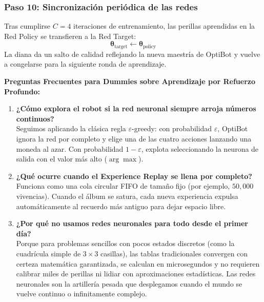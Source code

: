 \begin{calculomanual}
\subsubsection*{Paso 10: Sincronización periódica de las redes}
Tras cumplirse $C = 4$ iteraciones de entrenamiento, las perillas aprendidas en la Red Policy se transfieren a la Red Target:
\[
  \boldsymbol{\theta}_{\text{target}} \leftarrow \boldsymbol{\theta}_{\text{policy}}
\]
La diana da un salto de calidad reflejando la nueva maestría de OptiBot y vuelve a congelarse para la siguiente ronda de aprendizaje.
\end{calculomanual}

\begin{ideaclave}
\textbf{Preguntas Frecuentes para Dummies sobre Aprendizaje por Refuerzo Profundo:}
\begin{enumerate}
  \item \textbf{¿Cómo explora el robot si la red neuronal siempre arroja números continuos?} \\
  Seguimos aplicando la clásica regla $\varepsilon$-greedy: con probabilidad $\varepsilon$, OptiBot ignora la red por completo y elige una de las cuatro acciones lanzando una moneda al azar. Con probabilidad $1-\varepsilon$, explota seleccionando la neurona de salida con el valor más alto ($\arg\max$).
  \item \textbf{¿Qué ocurre cuando el Experience Replay se llena por completo?} \\
  Funciona como una cola circular FIFO de tamaño fijo (por ejemplo, $50{,}000$ vivencias). Cuando el álbum se satura, cada nueva experiencia expulsa automáticamente al recuerdo más antiguo para dejar espacio libre.
  \item \textbf{¿Por qué no usamos redes neuronales para todo desde el primer día?} \\
  Porque para problemas sencillos con pocos estados discretos (como la cuadrícula simple de $3 \times 3$ casillas), las tablas tradicionales convergen con certeza matemática garantizada, se calculan en microsegundos y no requieren calibrar miles de perillas ni lidiar con aproximaciones estadísticas. Las redes neuronales son la artillería pesada que desplegamos cuando el mundo se vuelve continuo o infinitamente complejo.
\end{enumerate}
\end{ideaclave}

